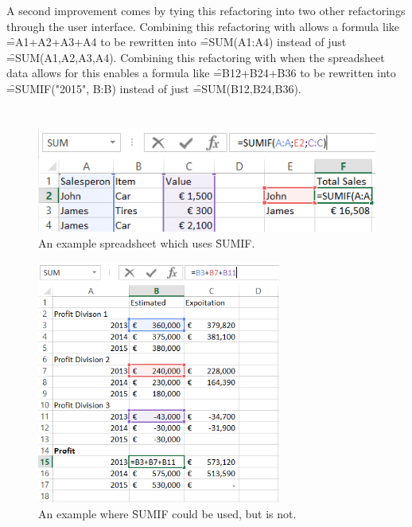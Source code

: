 A second improvement comes by tying this refactoring into two other refactorings through the user interface.
Combining this refactoring with  allows a formula like \f{=A1+A2+A3+A4} to be rewritten into \f{=SUM(A1:A4)} instead of just \f{=SUM(A1,A2,A3,A4)}.
Combining this refactoring with  when the spreadsheet data allows for this enables a formula like \f{=B12+B24+B36} to be rewritten into \f{=SUMIF("2015", B:B)} instead of just \f{=SUM(B12,B24,B36)}.

\section{}
\label{refac:introduceconditionalaggregate}

\begin{figure}
\centering
\includegraphics{implementation/aggregate/sumifexample}
\caption{An example spreadsheet which uses \f{SUMIF}.}
\label{fig:sumifexample}
\end{figure}

\begin{figure}
	\centering
	\includegraphics[height=8cm]{implementation/aggregate/condaggrexample}
	\caption{An example where \f{SUMIF} could be used, but is not.}
	\label{fig:sumifexample}
\end{figure}

